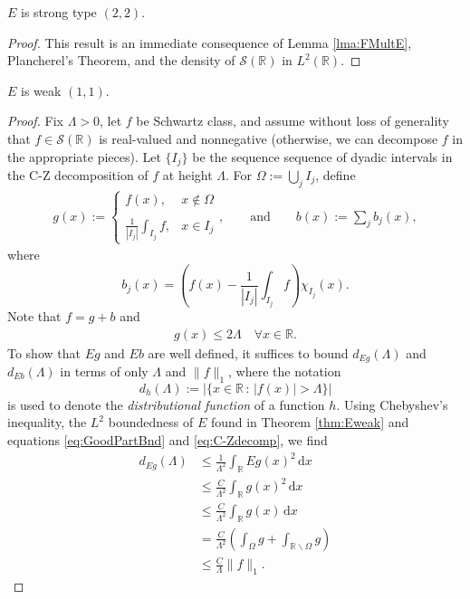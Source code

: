\documentclass[../dissertation.tex]{subfiles}
\begin{document}
\begin{thm}\label{thm:Estrong}
	$E$ is strong type $(2, 2)$.
\end{thm}
\begin{proof}
	This result is an immediate consequence of Lemma \ref{lma:FMultE}, 
	Plancherel's Theorem, and the density of $\mathscr S(\mathbb R)$ 
	in $L^2(\mathbb R)$.
\end{proof}


\begin{thm}\label{thm:Eweak}
	$E$ is weak $(1, 1)$.
\end{thm}
\begin{proof}
    Fix $\Lambda > 0$, let $f$ be Schwartz class, and assume without loss of 
    generality that $f \in \mathscr S(\mathbb R)$ is real-valued and nonnegative 
    (otherwise, we can decompose $f$ in the appropriate pieces).
    Let $\{ I_j \}$ be the sequence sequence of dyadic intervals in the C-Z decomposition of 
    $f$ at height $\Lambda$. For $\Omega := \bigcup_j I_j$, define 
    \begin{align}\label{eq:C-Zdecomp}
        g(x) :=  
            \begin{cases}
                \displaystyle f(x), & x \notin \Omega \\ \\
                \displaystyle \frac{1}{|I_j|} \int_{I_j} f, & x \in I_j
            \end{cases},
        \qquad \text{and} \qquad
        b(x) := \sum_j b_j(x),
    \end{align}
    where 
    \[
        b_j(x) = \left( f(x) - \dfrac{1}{|I_j|} \int_{I_j} f \right) \chi_{I_j}(x).
    \]
    Note that $f = g+b$ and
    \begin{align} \label{eq:GoodPartBnd}
        g(x) \leq 2 \Lambda \quad \forall x \in \mathbb R.
    \end{align}
    To show that $Eg$ and $Eb$ are well defined, it suffices
    to bound $d_{Eg}(\Lambda)$ and $d_{Eb}(\Lambda)$ in terms of only $\Lambda$ and 
    $\|f\|_1$, where
    the notation 
    \[
        d_h (\Lambda) := \big| \big\{ x \in \mathbb R \, : \, |f(x)| > \Lambda \big\} \big|
    \]
    is used to denote the {\em distributional function} of a function $h$. Using
    Chebyshev's inequality, the $L^2$  boundedness of $E$ found in Theorem \ref{thm:Eweak}
    and equations \eqref{eq:GoodPartBnd} and \eqref{eq:C-Zdecomp}, we find
    \begin{align}\label{eq:dEgBound}
        d_{Eg}(\Lambda)
            &\leq \frac{1}{\Lambda^2} \int_{\mathbb R} E g(x)^2 \, \mathrm{d}x \\
            &\leq \frac{C}{\Lambda^2} \int_{\mathbb R} g(x)^2 \, \mathrm{d}x \nonumber\\
            &\leq \frac{C}{\Lambda^2} \int_{\mathbb R} g(x) \, \mathrm{d}x \nonumber\\
            &= \frac{C}{\Lambda^2} \left( \int_{\Omega} g 
                + \int_{\mathbb{R} \backslash \Omega} g  \right) \nonumber\\
            &\leq \frac{C}{\Lambda} \| f \|_1.  \nonumber
    \end{align}



\end{proof}
\end{document}
